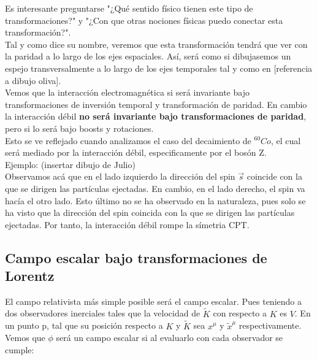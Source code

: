 \documentclass[../main.tex]{subfiles}
\begin{document}
Es interesante preguntarse "¿Qué sentido físico tienen este tipo de transformaciones?" y "¿Con que otras nociones físicas puedo conectar esta transformación?". \\

Tal y como dice su nombre, veremos que esta transformación tendrá que ver con la paridad a lo largo de los ejes espaciales. Así, será como si dibujasemos un espejo transversalmente a lo largo de los ejes temporales tal y como en [referencia a dibujo oliva]. \\

Vemos que la interacción electromagnética si será invariante bajo transformaciones de inversión temporal y transformación de paridad. En cambio la interacción débil \textbf{no será invariante bajo transformaciones de paridad}, pero si lo será bajo boosts y rotaciones. \\

Esto se ve reflejado cuando analizamos el caso del decaimiento de $^{60}Co$, el cual será mediado por la interacción débil, especificamente por el bosón Z. \\

Ejemplo: (insertar dibujo de Julio) \\

Observamos acá que en el lado izquierdo la dirección del spin $\vec{s}$ coincide con la que se dirigen las partículas ejectadas. En cambio, en el lado derecho, el spin va hacía el otro lado. Esto último no se ha observado en la naturaleza, pues solo se ha visto que la dirección del spin coincida con la que se dirigen las partículas ejectadas. Por tanto, la interacción débil rompe la símetria CPT. 



\subsection{Campo escalar bajo transformaciones de Lorentz} 

El campo relativista más simple posible será el campo escalar. Pues teniendo a dos observadores inerciales tales que la velocidad de $\tilde{K}$ con respecto a $K$ es $V$. En un punto p, tal que su posición respecto a $K$ y $\tilde{K}$ sea $x^\mu$ y $\tilde{x}^\mu$ respectivamente. Vemos que $\phi$ será un campo escalar si al evaluarlo con cada observador se cumple:
\end{document}
